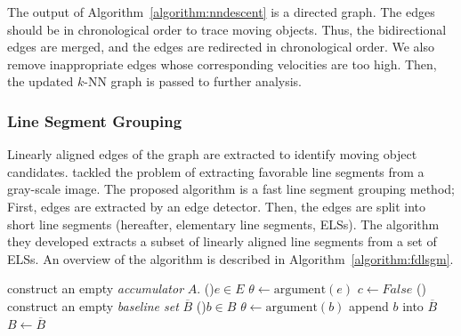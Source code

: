 The output of Algorithm~\ref{algorithm:nndescent} is a directed graph. The edges should be in chronological order to trace moving objects. Thus, the bidirectional edges are merged, and the edges are redirected in chronological order. We also remove inappropriate edges whose corresponding velocities are too high. Then, the updated $k$-NN graph is passed to further analysis.


\subsubsection{Line Segment Grouping}
\label{sec:algorithm:procedure:grouping}

Linearly aligned edges of the graph are extracted to identify moving object candidates. \citet{jang_fast_2002} tackled the problem of extracting favorable line segments from a gray-scale image. The proposed algorithm is a fast line segment grouping method; First, edges are extracted by an edge detector. Then, the edges are split into short line segments (hereafter, elementary line segments, ELSs). The algorithm they developed extracts a subset of linearly aligned line segments from a set of ELSs. An overview of the algorithm is described in Algorithm~\ref{algorithm:fdlsgm}.

\begin{algorithm}[t]
  \caption{\texttt{fast ELS grouping}}
  \label{algorithm:fdlsgm}
  \DontPrintSemicolon
  \BlankLine
  {construct an empty \textit{accumulator} $A$.}\;
  \ForEach(){$e \in E$}{
    {$\theta \gets \mathrm{argument}(e)$}\;
    {$c \gets \mathit{False}$}\;
  }
  \Loop(){}{
  }
  {construct an empty \textit{baseline set} $\overline{B}$}\;
  \ForEach(){$b \in B$}{
    {$\theta \gets \mathrm{argument}(b)$}\;
    {append $b$ into $\overline{B}$}\;
  }
  {$B \gets \overline{B}$}\;
\end{algorithm}

